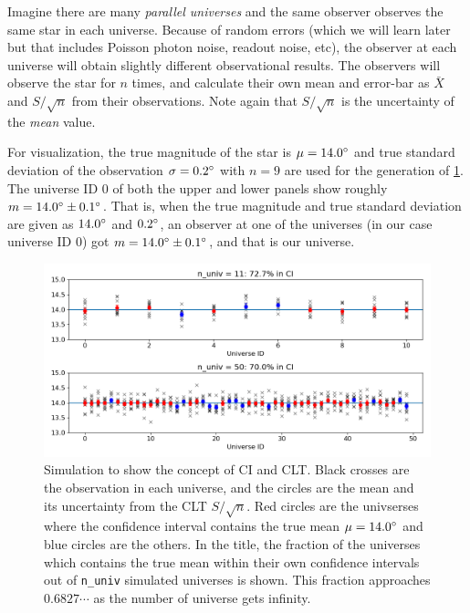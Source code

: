 \begin{ex}
  Imagine there are many \textit{parallel universes} and the same observer observes the same star in each universe. Because of random errors (which we will learn later but that includes Poisson photon noise, readout noise, etc), the observer at each universe will obtain slightly different observational results. The observers will observe the star for $ n $ times, and calculate their own mean and error-bar as $ \bar{X} $ and $ S / \sqrt{n} $ from their observations. Note again that  $ S / \sqrt{n} $ is the uncertainty of the \textit{mean} value.

  For visualization, the true magnitude of the star is $ \mu = \m{14.0} $ and true standard deviation of the observation $ \sigma = \m{0.2} $ with $ n = 9 $ are used for the generation of \cref{fig:figclt01}. The universe ID 0 of both the upper and lower panels show roughly $ m = \m{14.0} \pm \m{0.1} $. That is, when the true magnitude and true standard deviation are given as $ \m{14.0} $ and $ \m{0.2} $, an observer at one of the universes (in our case universe ID 0) got $ m = \m{14.0} \pm \m{0.1} $, and that is our universe. 
\end{ex}

\begin{figure}[ht!]
  \centering
  \includegraphics[width=1\linewidth]{figs/fig_clt01}
  \caption{Simulation to show the concept of CI and CLT. Black crosses are the observation in each universe, and the circles are the mean and its uncertainty from the CLT $ S / \sqrt{n} $. Red circles are the univserses where the confidence interval contains the true mean $ \mu = \m{14.0} $ and blue circles are the others. In the title, the fraction of the universes which contains the true mean within their own confidence intervals out of \texttt{n\_univ} simulated universes is shown. This fraction approaches $ 0.6827\cdots $ as the number of universe gets infinity.}
  \label{fig:figclt01}
\end{figure}

